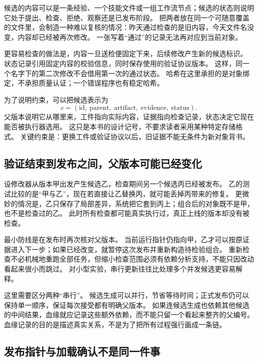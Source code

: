 候选的内容可以是一条经验、一个技能文件或一组工作流节点；候选的状态则说明它处于提出、检查、拒绝、观察还是已发布阶段。
把两者放在同一个可随意覆盖的文件里，会制造一种难以复核的情况：昨天通过检查的是旧内容，今天文件名没变，内容却已经被再次修改。
一张写着``通过''的记录无法再对应到当前对象。

更容易检查的做法是，内容一旦送检便固定下来，后续修改产生新的候选标识。
状态记录引用固定内容的校验信息，同时保存使用的验证协议版本。
这样，同一个名字下的第二次修改不会借用第一次的通过状态。
哈希在这里承担的是对象绑定，不承担质量认证；一个错误程序也有稳定哈希。

为了说明约束，可以把候选表示为
\begin{equation}
c=(\mathrm{id},\ \mathrm{parent},\ \mathrm{artifact},\ \mathrm{evidence},\ \mathrm{status}).
\label{eq:ch02-candidate}
\end{equation}
父版本说明它从哪里来，工件指向实际内容，证据指向检查记录，状态决定它现在能否被执行器选用。
这只是本书的设计记号，不要求读者采用某种特定存储格式。
关键约束是：更换工件或验证协议以后，旧证据不能无条件为新对象背书。

\subsection{验证结束到发布之间，父版本可能已经变化}

设修改器从版本甲出发产生候选乙，检查期间另一个候选丙已经被发布。
乙的测试比较的是``甲与乙''，现在若直接让乙替换丙，就可能丢掉丙带来的修复。
更微妙的情况是，乙只保存了局部差异，系统把它套到丙上；组合后的对象既不是甲，也不是检查过的乙。
此时所有检查都可能真实执行过，真正上线的版本却没有被检查。

最小防线是在发布时再次核对父版本。
当前运行指针仍指向甲，乙才可以按原证据进入下一步；如果已经改变，就暂停这次发布并重新构造待检验组合。
重新检查不必机械地重跑全部任务，但缩小检查范围必须有依赖分析支持，不能只因改动看起来很小而跳过。
对小型实验，串行更新往往比处理多个并发候选更容易解释。

这里需要区分两种``串行''。
候选生成可以并行，节省等待时间；正式发布仍可以保持单一顺序，保证每次接受都有明确父版本。
如果连候选生成也依赖其他候选的中间结果，血缘就应记录这些额外依赖，而不能只留一个看起来整齐的父编号。
血缘记录的目的是描述真实关系，不是为了把所有过程强行画成一条链。

\subsection{发布指针与加载确认不是同一件事}

